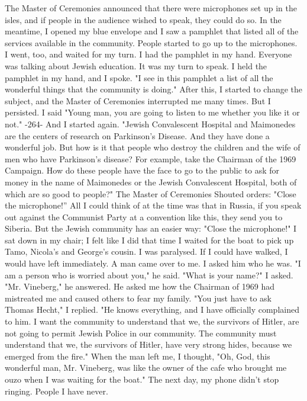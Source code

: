 The Master of Ceremonies announced that there were microphones 
set up in the isles, and if people in the audience wished to speak, 
they could do so. In the meantime, I opened my blue envelope and I 
saw a pamphlet that listed all of the services available in the community. People started to go up to the microphones. I went, too, 
and waited for my turn. I had the pamphlet in my hand. Everyone 
was talking about Jewish education. It was my turn to speak. 
I held the pamphlet in my hand, and I spoke. "I see in this 
pamphlet a list of all the wonderful things that the community is 
doing." After this, I started to change the subject, and the Master 
of Ceremonies interrupted me many times. But I persisted. I said 
"Young man, you are going to listen to me whether you like it or not." 
-264- 
And I started again. 
"Jewish Convalescent Hospital and Maimonedes are the centers 
of research on Parkinson's Disease. And they have done a wonderful job. 
But how is it that people who destroy the children and the wife 
of men who have Parkinson's disease? For example, take the Chairman 
of the 1969 Campaign. How do these people have the face to go to the 
public to ask for money in the name of Maimonedes or the Jewish Convalescent Hospital, both of which are so good to people?" 
The Master of Ceremonies Shouted orders: "Close the microphone!” 
All I could think of at the time was that in Russia, if you speak 
out against the Communist Party at a convention like this,
they send you to Siberia. But the Jewish community has an easier way: 
"Close the microphone!" I sat down in my chair; I felt like I did that 
time I waited for the boat to pick up Tamo, Nicola's and George's 
cousin. I was paralysed. If I could have walked, I would have left 
immediately. A man came over to me. I asked him who he was. 
"I am a person who is worried about you," he said. 
"What is your name?" I asked. 
"Mr. Vineberg," he answered. He asked me how the Chairman of 
1969 had mistreated me and caused others to fear my family. 
"You just have to ask Thomas Hecht," I replied. "He knows
everything, and I have officially complained to him. I want the 
community to understand that we, the survivors of Hitler, are not going to permit Jewish Police in our community. The community must 
understand that we, the survivors of Hitler, have very strong hides, 
because we emerged from the fire." 
When the man left me, I thought, "Oh, God, this wonderful man, 
Mr. Vineberg, was like the owner of the cafe who brought me ouzo when 
I was waiting for the boat." 
The next day, my phone didn't stop ringing. People I have never.
